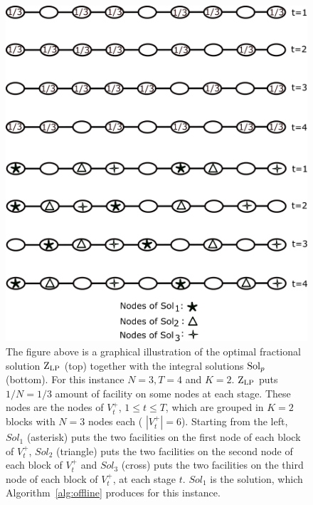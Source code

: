 \begin{figure}
    \centering
    \includegraphics[scale=0.14]{Sol_p.png}
    \caption{The figure above is a graphical illustration of the optimal fractional solution $\mathrm{Z}_{\mathrm{LP}}$ (top) together with the integral solutions $\mathrm{Sol}_p$ (bottom). For this instance $N=3, T=4$ and $K=2$. $\mathrm{Z}_{\mathrm{LP}}$ puts $1/N=1/3$ amount of facility on some nodes at each stage. These nodes are the nodes of $V_t^+$, $1 \leq t \leq T$, which are grouped in $K=2$ blocks with $N=3$ nodes each ( $|V_t^+|=6$). Starting from the left, $Sol_1$ (asterisk) puts the two facilities  on the first node of each block of $V_t^+$, $Sol_2$ (triangle) puts the two facilities on the second node of each block of $V_t^+$ and $Sol_3$ (cross) puts the two facilities on the third node of each block of $V_t^+$, at each stage $t$. $Sol_1$ is the solution, which  Algorithm~\ref{alg:offline} produces for this instance.}
    \label{fig:Sol_p}
\end{figure}



